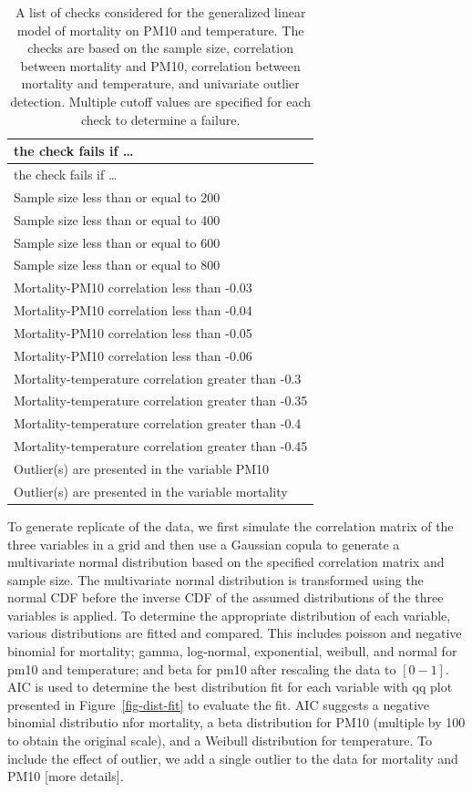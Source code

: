 \documentclass[
  12pt,
]{interact}
\begin{document}
\begin{longtable}[]{@{}l@{}}
\caption{A list of checks considered for the generalized linear model of
mortality on PM10 and temperature. The checks are based on the sample
size, correlation between mortality and PM10, correlation between
mortality and temperature, and univariate outlier detection. Multiple
cutoff values are specified for each check to determine a
failure.}\label{tbl-checks}\tabularnewline
\toprule\noalign{}
the check fails if \ldots{} \\
\midrule\noalign{}
\endfirsthead
\toprule\noalign{}
the check fails if \ldots{} \\
\midrule\noalign{}
\endhead
\bottomrule\noalign{}
\endlastfoot
Sample size less than or equal to 200 \\
Sample size less than or equal to 400 \\
Sample size less than or equal to 600 \\
Sample size less than or equal to 800 \\
Mortality-PM10 correlation less than -0.03 \\
Mortality-PM10 correlation less than -0.04 \\
Mortality-PM10 correlation less than -0.05 \\
Mortality-PM10 correlation less than -0.06 \\
Mortality-temperature correlation greater than -0.3 \\
Mortality-temperature correlation greater than -0.35 \\
Mortality-temperature correlation greater than -0.4 \\
Mortality-temperature correlation greater than -0.45 \\
Outlier(s) are presented in the variable PM10 \\
Outlier(s) are presented in the variable mortality \\
\end{longtable}

To generate replicate of the data, we first simulate the correlation
matrix of the three variables in a grid and then use a Gaussian copula
to generate a multivariate normal distribution based on the specified
correlation matrix and sample size. The multivariate normal distribution
is transformed using the normal CDF before the inverse CDF of the
assumed distributions of the three variables is applied. To determine
the appropriate distribution of each variable, various distributions are
fitted and compared. This includes poisson and negative binomial for
mortality; gamma, log-normal, exponential, weibull, and normal for pm10
and temperature; and beta for pm10 after rescaling the data to
\([0-1]\). AIC is used to determine the best distribution fit for each
variable with qq plot presented in Figure~\ref{fig-dist-fit} to evaluate
the fit. AIC suggests a negative binomial distributio nfor mortality, a
beta distribution for PM10 (multiple by 100 to obtain the original
scale), and a Weibull distribution for temperature. To include the
effect of outlier, we add a single outlier to the data for mortality and
PM10 {[}more details{]}.
\end{document}
